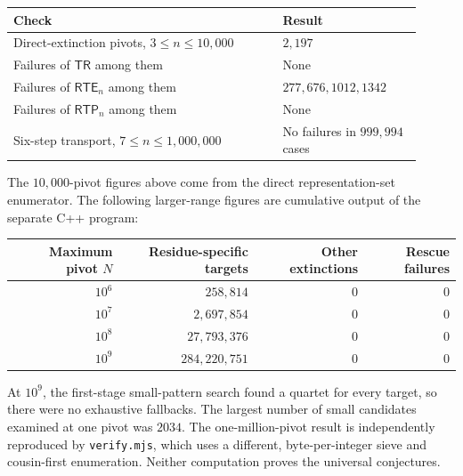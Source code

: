 \documentclass[11pt,a4paper]{article}
\theoremstyle{definition}
\theoremstyle{remark}
\newcommand{\TR}{\mathsf{TR}}
\newcommand{\RTE}{\mathsf{RTE}}
\newcommand{\RTP}{\mathsf{RTP}}
\begin{document}
\begin{center}
\begin{tabular}{@{}p{0.60\linewidth}p{0.31\linewidth}@{}}
\toprule
Check & Result\\
\midrule
Direct-extinction pivots, $3\le n\le10{,}000$ & $2{,}197$\\
Failures of $\TR$ among them & None\\
Failures of $\RTE_n$ among them & $277,676,1012,1342$\\
Failures of $\RTP_n$ among them & None\\
Six-step transport, $7\le n\le1{,}000{,}000$ & No failures in $999{,}994$ cases\\
\bottomrule
\end{tabular}
\end{center}
The $10{,}000$-pivot figures above come from the direct
representation-set enumerator. The following larger-range figures
are cumulative output of the separate C++ program:
\begin{center}
\begin{tabular}{@{}rrrr@{}}
\toprule
Maximum pivot $N$ & Residue-specific targets & Other extinctions
& Rescue failures\\
\midrule
$10^6$ & $258{,}814$ & $0$ & $0$\\
$10^7$ & $2{,}697{,}854$ & $0$ & $0$\\
$10^8$ & $27{,}793{,}376$ & $0$ & $0$\\
$10^9$ & $284{,}220{,}751$ & $0$ & $0$\\
\bottomrule
\end{tabular}
\end{center}
At $10^9$, the first-stage small-pattern search found a quartet
for every target, so there were no exhaustive fallbacks. The largest
number of small candidates examined at one pivot was $2034$.
The one-million-pivot result is independently reproduced by
\texttt{verify.mjs}, which uses a different, byte-per-integer sieve
and cousin-first enumeration. Neither computation proves the
universal conjectures.
\end{document}
